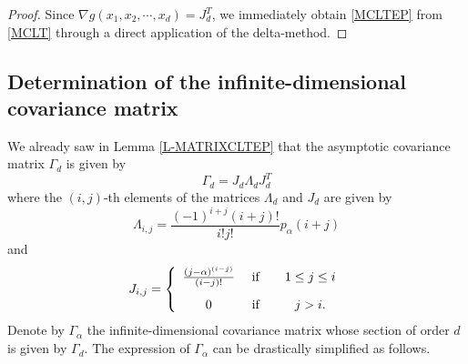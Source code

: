 \documentclass[twoside,12pt]{article}
\begin{document}
\begin{proof}
Since $\nabla g(x_{1}, x_{2},\cdots, x_{d})=J_d^T$, we immediately obtain \eqref{MCLTEP} 
from \eqref{MCLT} through a direct application of the delta-method.  
\end{proof}

\subsection{Determination of the infinite-dimensional covariance matrix} 
\label{Sub-COV}


We already saw in Lemma \ref{L-MATRIXCLTEP} that the asymptotic covariance matrix $\Gamma_d$ is given by
\begin{equation}
\label{DEFGamma}
\Gamma_d=J_d \Lambda_d J_d^T
\end{equation}
where the  $(i,j)$-th elements of the matrices $\Lambda_d$ and $J_d$ are given by 
\begin{equation*}
\Lambda_{i,j}= \frac{(-1)^{i+j}(i+j)!}{i!j!}p_{\alpha}(i+j)
\end{equation*}
and
\begin{equation*}
J_{i,j}=\left \{ \begin{array}{ccc}
    \frac{(j-\alpha)^{(i-j)}}{(i-j)!}  & \text{ if } & \ \ 1 \leq j \leq i \vspace{2ex}\\
     0 & \text{ if }  & \ \ j>i.
   \end{array}  \right.
\end{equation*}
Denote by $\Gamma_\alpha$ the infinite-dimensional covariance matrix whose section of order $d$ is given by $\Gamma_d$.
The expression of $\Gamma_\alpha$ can be drastically simplified as follows.
\end{document}
